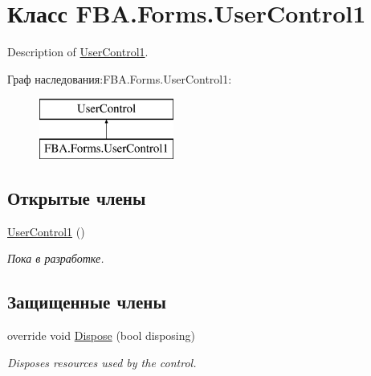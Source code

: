 \hypertarget{class_f_b_a_1_1_forms_1_1_user_control1}{}\section{Класс F\+B\+A.\+Forms.\+User\+Control1}
\label{class_f_b_a_1_1_forms_1_1_user_control1}


Description of \mbox{\hyperlink{class_f_b_a_1_1_forms_1_1_user_control1}{User\+Control1}}.  


Граф наследования\+:F\+B\+A.\+Forms.\+User\+Control1\+:\begin{figure}[H]
\begin{center}
\leavevmode
\includegraphics[height=2.000000cm]{class_f_b_a_1_1_forms_1_1_user_control1}
\end{center}
\end{figure}
\subsection*{Открытые члены}
\begin{DoxyCompactItemize}
\item 
\mbox{\hyperlink{class_f_b_a_1_1_forms_1_1_user_control1_a226de5d82a2ac1946e939b821b829b0b}{User\+Control1}} ()
\begin{DoxyCompactList}\small\item\em Пока в разработке. \end{DoxyCompactList}\end{DoxyCompactItemize}
\subsection*{Защищенные члены}
\begin{DoxyCompactItemize}
\item 
override void \mbox{\hyperlink{class_f_b_a_1_1_forms_1_1_user_control1_a82464b78281ed2ffd68292863830b3b2}{Dispose}} (bool disposing)
\begin{DoxyCompactList}\small\item\em Disposes resources used by the control. \end{DoxyCompactList}\end{DoxyCompactItemize}


